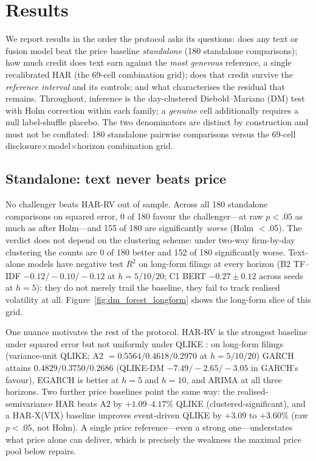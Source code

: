 \section{Results}
\label{sec:results}

We report results in the order the protocol asks its questions: does any text or fusion model beat the price baseline \emph{standalone} (180 standalone comparisons); how much credit does text earn against the \emph{most generous} reference, a single recalibrated HAR (the 69-cell combination grid); does that credit survive the \emph{reference interval} and its controls; and what characterises the residual that remains. Throughout, inference is the day-clustered Diebold--Mariano (DM) test \citep{diebold1995comparing,harvey1997testing} with Holm correction \citep{holm1979simple} within each family; a \emph{genuine} cell additionally requires a null label-shuffle placebo. The two denominators are distinct by construction and must not be conflated: 180 standalone pairwise comparisons versus the 69-cell disclosure$\times$model$\times$horizon combination grid.

\subsection{Standalone: text never beats price}
\label{sec:results-standalone}

No challenger beats HAR-RV out of sample. Across all 180 standalone comparisons on squared error, 0 of 180 favour the challenger---at raw $p<.05$ as much as after Holm---and 155 of 180 are significantly \emph{worse} (Holm $<.05$). The verdict does not depend on the clustering scheme: under two-way firm-by-day clustering \citep{cameron2011twoway} the counts are 0 of 180 better and 152 of 180 significantly worse. Text-alone models have negative test $R^2$ on long-form filings at every horizon (B2 TF--IDF $-0.12/-0.10/-0.12$ at $h{=}5/10/20$; C1 BERT $-0.27\pm0.12$ across seeds at $h{=}5$): they do not merely trail the baseline, they fail to track realised volatility at all. Figure~\ref{fig:dm_forest_longform} shows the long-form slice of this grid.

One nuance motivates the rest of the protocol. HAR-RV \citep{corsi2009har} is the strongest baseline under squared error but not uniformly under QLIKE \citep{patton2011proxies}: on long-form filings (variance-unit QLIKE; A2 $=0.5564/0.4618/0.2970$ at $h{=}5/10/20$) GARCH attains $0.4829/0.3750/0.2686$ (QLIKE-DM $-7.49/-2.65/-3.05$ in GARCH's favour), EGARCH is better at $h{=}5$ and $h{=}10$, and ARIMA at all three horizons. Two further price baselines point the same way: the realised-semivariance HAR \citep[SHAR;][]{pattonsheppard2015shar} beats A2 by $+1.09$--$4.17\%$ QLIKE (clustered-significant), and a HAR-X(VIX) baseline improves event-driven QLIKE by $+3.09$ to $+3.60\%$ (raw $p<.05$, not Holm). A single price reference---even a strong one---understates what price alone can deliver, which is precisely the weakness the maximal price pool below repairs.

